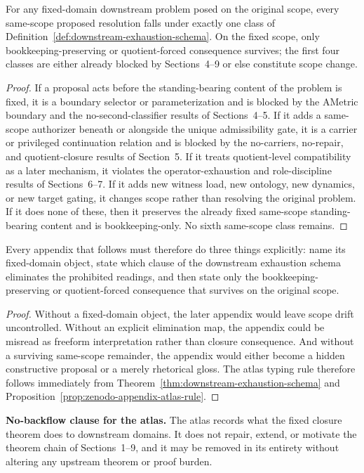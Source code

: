 \begin{theorem}
\label{thm:downstream-exhaustion-schema}
For any fixed-domain downstream problem posed on the original scope, every same-scope proposed resolution falls under exactly one class of Definition~\ref{def:downstream-exhaustion-schema}. On the fixed scope, only bookkeeping-preserving or quotient-forced consequence survives; the first four classes are either already blocked by Sections~4--9 or else constitute scope change.
\end{theorem}

\begin{proof}
If a proposal acts before the standing-bearing content of the problem is fixed, it is a boundary selector or parameterization and is blocked by the AMetric boundary and the no-second-classifier results of Sections~4--5. If it adds a same-scope authorizer beneath or alongside the unique admissibility gate, it is a carrier or privileged continuation relation and is blocked by the no-carriers, no-repair, and quotient-closure results of Section~5. If it treats quotient-level compatibility as a later mechanism, it violates the operator-exhaustion and role-discipline results of Sections~6--7. If it adds new witness load, new ontology, new dynamics, or new target gating, it changes scope rather than resolving the original problem. If it does none of these, then it preserves the already fixed same-scope standing-bearing content and is bookkeeping-only. No sixth same-scope class remains.
\end{proof}

\begin{corollary}
Every appendix that follows must therefore do three things explicitly: name its fixed-domain object, state which clause of the downstream exhaustion schema eliminates the prohibited readings, and then state only the bookkeeping-preserving or quotient-forced consequence that survives on the original scope.
\end{corollary}

\begin{proof}
Without a fixed-domain object, the later appendix would leave scope drift uncontrolled. Without an explicit elimination map, the appendix could be misread as freeform interpretation rather than closure consequence. And without a surviving same-scope remainder, the appendix would either become a hidden constructive proposal or a merely rhetorical gloss. The atlas typing rule therefore follows immediately from Theorem~\ref{thm:downstream-exhaustion-schema} and Proposition~\ref{prop:zenodo-appendix-atlas-rule}.
\end{proof}

\begin{reviewbox}
\textbf{No-backflow clause for the atlas.} The atlas records what the fixed closure theorem does to downstream domains. It does not repair, extend, or motivate the theorem chain of Sections~1--9, and it may be removed in its entirety without altering any upstream theorem or proof burden.
\end{reviewbox}
